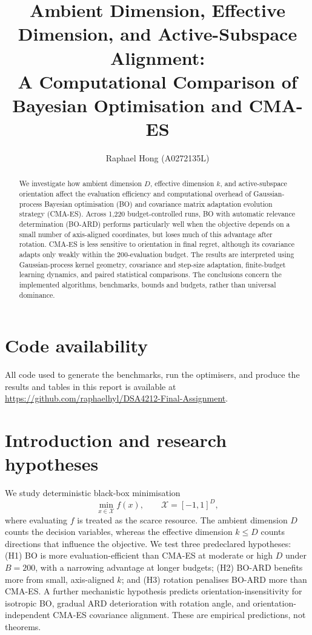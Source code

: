 \documentclass[11pt,a4paper]{article}
\title{Ambient Dimension, Effective Dimension, and Active-Subspace Alignment:\\A Computational Comparison of Bayesian Optimisation and CMA-ES}
\author{}
\date{}
\begin{document}
\maketitle
\author{Raphael Hong (A0272135L)}
\begin{abstract}
We investigate how ambient dimension $D$, effective dimension $k$, and active-subspace orientation affect the evaluation efficiency and computational overhead of Gaussian-process Bayesian optimisation (BO) and covariance matrix adaptation evolution strategy (CMA-ES). Across 1,220 budget-controlled runs, BO with automatic relevance determination (BO-ARD) performs particularly well when the objective depends on a small number of axis-aligned coordinates, but loses much of this advantage after rotation. CMA-ES is less sensitive to orientation in final regret, although its covariance adapts only weakly within the 200-evaluation budget. %
The results are interpreted using Gaussian-process kernel geometry, covariance and step-size adaptation, finite-budget learning dynamics, and paired statistical comparisons. %
The conclusions concern the implemented algorithms, benchmarks, bounds and budgets, rather than universal dominance.
\end{abstract}
\section*{Code availability}
All code used to generate the benchmarks, run the optimisers, and produce the results and tables in this report is available at \url{https://github.com/raphaelhyl/DSA4212-Final-Assignment}.
\section{Introduction and research hypotheses}
We study deterministic black-box minimisation
\begin{equation}\min_{x\in\mathcal X}f(x),\qquad \mathcal X=[-1,1]^D,\end{equation}
where evaluating $f$ is treated as the scarce resource. The ambient dimension $D$ counts the decision variables, whereas the effective dimension $k\le D$ counts directions that influence the objective. We test three predeclared hypotheses: (H1) BO is more evaluation-efficient than CMA-ES at moderate or high $D$ under $B=200$, with a narrowing advantage at longer budgets; (H2) BO-ARD benefits more from small, axis-aligned $k$; and (H3) rotation penalises BO-ARD more than CMA-ES. A further mechanistic hypothesis predicts orientation-insensitivity for isotropic BO, gradual ARD deterioration with rotation angle, and orientation-independent CMA-ES covariance alignment. These are empirical predictions, not theorems.
\end{document}
